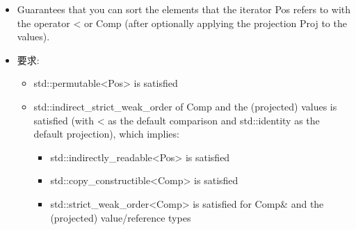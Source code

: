 \begin{itemize}
\item
Guarantees that you can sort the elements that the iterator Pos refers to with the operator < or Comp (after optionally applying the projection Proj to the values).

\item
要求:
\begin{itemize}
\item
std::permutable<Pos> is satisfied

\item
std::indirect\_strict\_weak\_order of Comp and the (projected) values is satisfied (with < as the default comparison and std::identity as the default projection), which implies:

\begin{itemize}
\item
std::indirectly\_readable<Pos> is satisfied

\item
std::copy\_constructible<Comp> is satisfied

\item
std::strict\_weak\_order<Comp> is satisfied for Comp\& and the (projected) value/reference types
\end{itemize}
\end{itemize}
\end{itemize}

























